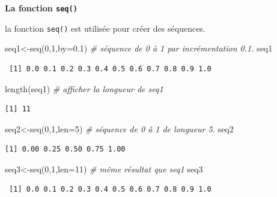 \documentclass[
  8pt,
  ignorenonframetext,
]{beamer}
\newenvironment{Shaded}{\begin{snugshade}}{\end{snugshade}}
\newcommand{\AttributeTok}[1]{\textcolor[rgb]{0.77,0.63,0.00}{#1}}
\newcommand{\CommentTok}[1]{\textcolor[rgb]{0.56,0.35,0.01}{\textit{#1}}}
\newcommand{\DecValTok}[1]{\textcolor[rgb]{0.00,0.00,0.81}{#1}}
\newcommand{\FloatTok}[1]{\textcolor[rgb]{0.00,0.00,0.81}{#1}}
\newcommand{\FunctionTok}[1]{\textcolor[rgb]{0.00,0.00,0.00}{#1}}
\newcommand{\NormalTok}[1]{#1}
\newcommand{\OtherTok}[1]{\textcolor[rgb]{0.56,0.35,0.01}{#1}}
\begin{document}
\begin{frame}[fragile]
\textbf{La fonction \texttt{seq()}}

la fonction \texttt{seq()} est utilisée pour créer des séquences.

\begin{Shaded}
\begin{Highlighting}[]
\NormalTok{seq1}\OtherTok{\textless{}{-}}\FunctionTok{seq}\NormalTok{(}\DecValTok{0}\NormalTok{,}\DecValTok{1}\NormalTok{,}\AttributeTok{by=}\FloatTok{0.1}\NormalTok{)  }\CommentTok{\# séquence de 0 à 1 par incrémentation 0.1.}
\NormalTok{seq1}
\end{Highlighting}
\end{Shaded}

\begin{verbatim}
 [1] 0.0 0.1 0.2 0.3 0.4 0.5 0.6 0.7 0.8 0.9 1.0
\end{verbatim}

\begin{Shaded}
\begin{Highlighting}[]
\FunctionTok{length}\NormalTok{(seq1)   }\CommentTok{\# afficher la longueur de seq1}
\end{Highlighting}
\end{Shaded}

\begin{verbatim}
[1] 11
\end{verbatim}

\begin{Shaded}
\begin{Highlighting}[]
\NormalTok{seq2}\OtherTok{\textless{}{-}}\FunctionTok{seq}\NormalTok{(}\DecValTok{0}\NormalTok{,}\DecValTok{1}\NormalTok{,}\AttributeTok{len=}\DecValTok{5}\NormalTok{)   }\CommentTok{\# séquence de 0 à 1 de longueur 5.}
\NormalTok{seq2}
\end{Highlighting}
\end{Shaded}

\begin{verbatim}
[1] 0.00 0.25 0.50 0.75 1.00
\end{verbatim}

\begin{Shaded}
\begin{Highlighting}[]
\NormalTok{seq3}\OtherTok{\textless{}{-}}\FunctionTok{seq}\NormalTok{(}\DecValTok{0}\NormalTok{,}\DecValTok{1}\NormalTok{,}\AttributeTok{len=}\DecValTok{11}\NormalTok{)  }\CommentTok{\# même résultat que seq1}
\NormalTok{seq3}
\end{Highlighting}
\end{Shaded}

\begin{verbatim}
 [1] 0.0 0.1 0.2 0.3 0.4 0.5 0.6 0.7 0.8 0.9 1.0
\end{verbatim}
\end{frame}
\end{document}
